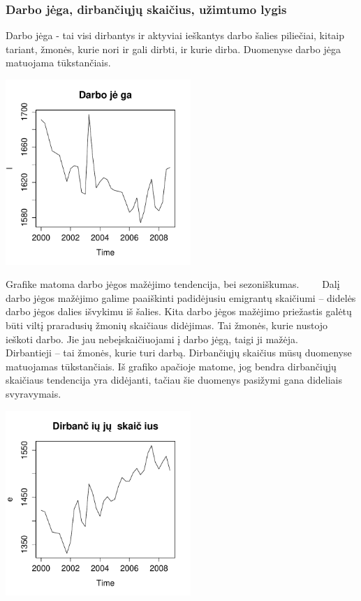 \documentclass[12pt,a4paper]{article}
\theoremstyle{change}\newtheorem{salyga}{Uždavinys}
\begin{document}
\subsubsection{Darbo jėga, dirbančiųjų skaičius, užimtumo lygis}

\hspace{40pt} Darbo jėga - tai visi dirbantys ir aktyviai ieškantys darbo šalies piliečiai, kitaip tariant, žmonės, kurie nori ir gali dirbti, ir kurie dirba. Duomenyse darbo jėga matuojama tūkstančiais. 
\vskip 8pt
\begin{center}
\includegraphics[width=70mm,height=70mm]{l}
\end{center}
Grafike matoma  darbo jėgos mažėjimo tendencija, bei sezoniškumas.
\vskip 8pt
$\qquad$Dalį darbo jėgos mažėjimo galime paaiškinti padidėjusiu emigrantų skaičiumi – didelės darbo jėgos dalies išvykimu iš šalies. Kita darbo jėgos mažėjimo priežastis galėtų būti viltį praradusių žmonių skaičiaus didėjimas. Tai žmonės, kurie nustojo ieškoti darbo. Jie jau nebeįskaičiuojami į darbo jėgą, taigi ji mažėja. 
\vskip 8pt
$\qquad$Dirbantieji – tai žmonės, kurie turi darbą. Dirbančiųjų skaičius mūsų duomenyse matuojamas tūkstančiais. Iš  grafiko apačioje matome, jog bendra dirbančiųjų skaičiaus tendencija yra didėjanti, tačiau šie duomenys pasižymi gana dideliais svyravymais.
\vskip 8pt
\begin{center}
\includegraphics[width=70mm,height=70mm]{e}
\end{center}
\end{document}
